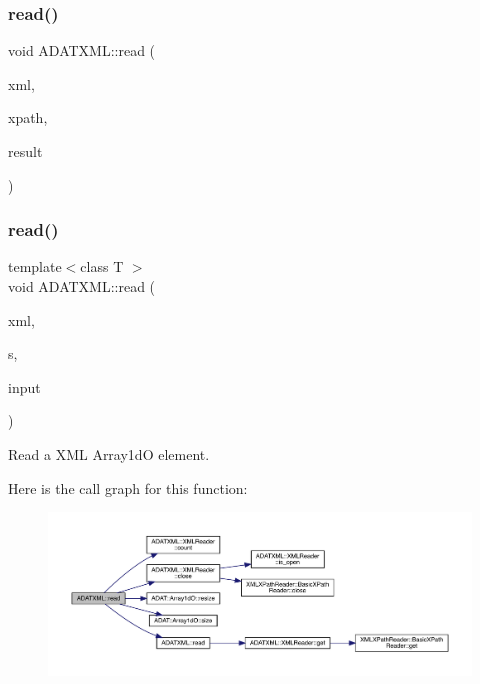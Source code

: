 \mbox{\label{group__io_gaf12f0eb15652e228314c4a67e168688d}} 
\subsubsection{\texorpdfstring{read()}{read()}\hspace{0.1cm}{\footnotesize\ttfamily [44/52]}}
{\footnotesize\ttfamily void A\+D\+A\+T\+X\+M\+L\+::read (\begin{DoxyParamCaption}\item[{\mbox{\hyperlink{classADATXML_1_1XMLReader}{X\+M\+L\+Reader}} \&}]{xml,  }\item[{const std\+::string \&}]{xpath,  }\item[{\mbox{\hyperlink{classADAT_1_1Array1dO}{A\+D\+A\+T\+::\+Array1dO}}$<$ short int $>$ \&}]{result }\end{DoxyParamCaption})}

\mbox{\label{group__io_gaba638604c3a98bce5724245a7fad4055}} 
\subsubsection{\texorpdfstring{read()}{read()}\hspace{0.1cm}{\footnotesize\ttfamily [45/52]}}
{\footnotesize\ttfamily template$<$class T $>$ \\
void A\+D\+A\+T\+X\+M\+L\+::read (\begin{DoxyParamCaption}\item[{\mbox{\hyperlink{classADATXML_1_1XMLReader}{X\+M\+L\+Reader}} \&}]{xml,  }\item[{const std\+::string \&}]{s,  }\item[{\mbox{\hyperlink{classADAT_1_1Array1dO}{A\+D\+A\+T\+::\+Array1dO}}$<$ T $>$ \&}]{input }\end{DoxyParamCaption})\hspace{0.3cm}{\ttfamily [inline]}}



Read a X\+ML Array1dO element. 

Here is the call graph for this function\+:\nopagebreak
\begin{figure}[H]
\begin{center}
\leavevmode
\includegraphics[width=350pt]{d2/da3/group__io_gaba638604c3a98bce5724245a7fad4055_cgraph}
\end{center}
\end{figure}
\mbox{\label{group__io_gafcc468224ec7aadb6f062319ee4a9017}} 
